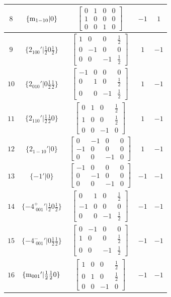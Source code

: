 \documentclass[fleqn,8pt]{jsarticle}
\begin{document}
\begin{longtable}{ccccc}
$ 8 $ & $ \{{\rm m}_{1-10}|0\} $ & $ \begin{bmatrix} 0 & 1 & 0 & 0 \\ 1 & 0 & 0 & 0 \\ 0 & 0 & 1 & 0 \end{bmatrix} $ & $ -1 $ & $ 1 $ \\ \hline
$ 9 $ & $ \{2{}_{100}{}'|\frac{1}{2} 0 \frac{1}{2}\} $ & $ \begin{bmatrix} 1 & 0 & 0 & \frac{1}{2} \\ 0 & -1 & 0 & 0 \\ 0 & 0 & -1 & \frac{1}{2} \end{bmatrix} $ & $ 1 $ & $ -1 $ \\ \hline
$ 10 $ & $ \{2{}_{010}{}'|0 \frac{1}{2} \frac{1}{2}\} $ & $ \begin{bmatrix} -1 & 0 & 0 & 0 \\ 0 & 1 & 0 & \frac{1}{2} \\ 0 & 0 & -1 & \frac{1}{2} \end{bmatrix} $ & $ 1 $ & $ -1 $ \\ \hline
$ 11 $ & $ \{2{}_{110}{}'|\frac{1}{2} \frac{1}{2} 0\} $ & $ \begin{bmatrix} 0 & 1 & 0 & \frac{1}{2} \\ 1 & 0 & 0 & \frac{1}{2} \\ 0 & 0 & -1 & 0 \end{bmatrix} $ & $ 1 $ & $ -1 $ \\ \hline
$ 12 $ & $ \{2{}_{1-10}{}'|0\} $ & $ \begin{bmatrix} 0 & -1 & 0 & 0 \\ -1 & 0 & 0 & 0 \\ 0 & 0 & -1 & 0 \end{bmatrix} $ & $ 1 $ & $ -1 $ \\ \hline
$ 13 $ & $ \{-1{}'|0\} $ & $ \begin{bmatrix} -1 & 0 & 0 & 0 \\ 0 & -1 & 0 & 0 \\ 0 & 0 & -1 & 0 \end{bmatrix} $ & $ -1 $ & $ -1 $ \\ \hline
$ 14 $ & $ \{-4^{+}_{\,\,001}{}'|\frac{1}{2} 0 \frac{1}{2}\} $ & $ \begin{bmatrix} 0 & 1 & 0 & \frac{1}{2} \\ -1 & 0 & 0 & 0 \\ 0 & 0 & -1 & \frac{1}{2} \end{bmatrix} $ & $ -1 $ & $ -1 $ \\ \hline
$ 15 $ & $ \{-4^{-}_{\,\,001}{}'|0 \frac{1}{2} \frac{1}{2}\} $ & $ \begin{bmatrix} 0 & -1 & 0 & 0 \\ 1 & 0 & 0 & \frac{1}{2} \\ 0 & 0 & -1 & \frac{1}{2} \end{bmatrix} $ & $ -1 $ & $ -1 $ \\ \hline
$ 16 $ & $ \{{\rm m}_{001}{}'|\frac{1}{2} \frac{1}{2} 0\} $ & $ \begin{bmatrix} 1 & 0 & 0 & \frac{1}{2} \\ 0 & 1 & 0 & \frac{1}{2} \\ 0 & 0 & -1 & 0 \end{bmatrix} $ & $ -1 $ & $ -1 $ \\
\end{longtable}
\end{document}
